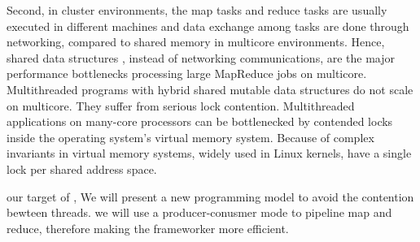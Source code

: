Second, in cluster environments, 
the map tasks and reduce tasks are usually 
executed in different machines and data exchange among
tasks are done through networking, 
compared to shared memory in multicore environments. 
Hence, shared data structures , 
instead of networking communications, 
are the major performance bottlenecks processing large MapReduce jobs on multicore.
Multithreaded programs with hybrid shared mutable
data structures do not scale on multicore.
They suffer from serious lock contention.
Multithreaded applications on many-core processors can be
bottlenecked by contended locks inside the operating system’s
virtual memory system. 
Because of complex invariants in virtual memory systems, 
widely used in Linux kernels, 
have a single lock per shared address space. 
\cite{clements2013radixvm}


{\color{red}our target of \myds, 
We will present a new programming model to avoid the contention bewteen threads.
we will use a producer-conusmer mode to pipeline map and reduce,
therefore making the frameworker more efficient.}


